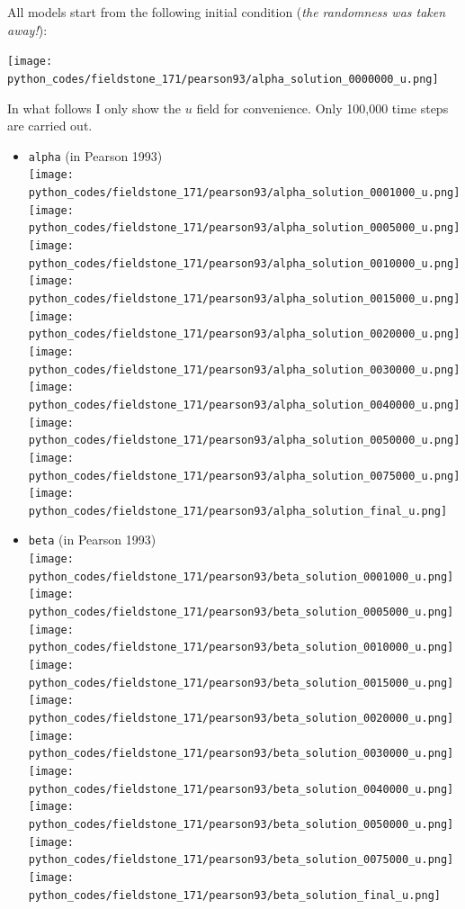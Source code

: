 All models start from the following initial condition ({\it the randomness was taken away!}):
\begin{center}
\texttt{[image: python\_codes/fieldstone\_171/pearson93/alpha\_solution\_0000000\_u.png]}
\end{center}

In what follows I only show the $u$ field for convenience.
Only 100,000 time steps are carried out.

\begin{itemize}
\item {\tt alpha} (in Pearson 1993)\\
\texttt{[image: python\_codes/fieldstone\_171/pearson93/alpha\_solution\_0001000\_u.png]}
\texttt{[image: python\_codes/fieldstone\_171/pearson93/alpha\_solution\_0005000\_u.png]}
\texttt{[image: python\_codes/fieldstone\_171/pearson93/alpha\_solution\_0010000\_u.png]}
\texttt{[image: python\_codes/fieldstone\_171/pearson93/alpha\_solution\_0015000\_u.png]}
\texttt{[image: python\_codes/fieldstone\_171/pearson93/alpha\_solution\_0020000\_u.png]}
\texttt{[image: python\_codes/fieldstone\_171/pearson93/alpha\_solution\_0030000\_u.png]}
\texttt{[image: python\_codes/fieldstone\_171/pearson93/alpha\_solution\_0040000\_u.png]}
\texttt{[image: python\_codes/fieldstone\_171/pearson93/alpha\_solution\_0050000\_u.png]}
\texttt{[image: python\_codes/fieldstone\_171/pearson93/alpha\_solution\_0075000\_u.png]}
\texttt{[image: python\_codes/fieldstone\_171/pearson93/alpha\_solution\_final\_u.png]}
\item {\tt beta} (in Pearson 1993)\\
\texttt{[image: python\_codes/fieldstone\_171/pearson93/beta\_solution\_0001000\_u.png]}
\texttt{[image: python\_codes/fieldstone\_171/pearson93/beta\_solution\_0005000\_u.png]}
\texttt{[image: python\_codes/fieldstone\_171/pearson93/beta\_solution\_0010000\_u.png]}
\texttt{[image: python\_codes/fieldstone\_171/pearson93/beta\_solution\_0015000\_u.png]}
\texttt{[image: python\_codes/fieldstone\_171/pearson93/beta\_solution\_0020000\_u.png]}
\texttt{[image: python\_codes/fieldstone\_171/pearson93/beta\_solution\_0030000\_u.png]}
\texttt{[image: python\_codes/fieldstone\_171/pearson93/beta\_solution\_0040000\_u.png]}
\texttt{[image: python\_codes/fieldstone\_171/pearson93/beta\_solution\_0050000\_u.png]}
\texttt{[image: python\_codes/fieldstone\_171/pearson93/beta\_solution\_0075000\_u.png]}
\texttt{[image: python\_codes/fieldstone\_171/pearson93/beta\_solution\_final\_u.png]}


\end{itemize}
